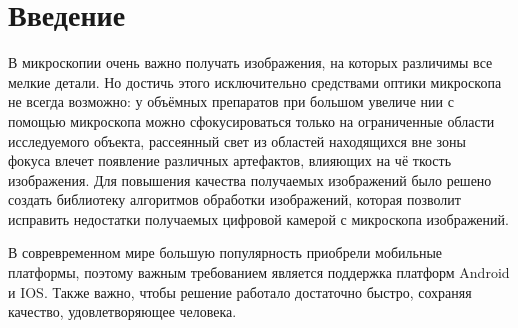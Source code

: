\documentclass[14pt]{matmex-diploma-custom}
\begin{document}

\maketitle
\tableofcontents
\section*{Введение}
В микроскопии очень важно получать изображения, на которых различимы все мелкие детали. Но достичь этого исключительно средствами оптики микроскопа не всегда возможно: у объёмных препаратов при большом увеличе    нии с помощью микроскопа можно сфокусироваться только на ограниченные области исследуемого объекта, рассеянный свет из областей находящихся вне зоны фокуса влечет появление различных артефактов, влияющих на чё    ткость изображения. Для повышения качества получаемых изображений было решено создать библиотеку алгоритмов обработки изображений, которая позволит исправить недостатки получаемых цифровой камерой с микроскопа изображений.
\par
В совревременном мире большую популярность приобрели мобильные платформы, поэтому важным требованием является поддержка платформ Android и IOS. Также важно, чтобы решение работало достаточно быстро, сохраняя качество, удовлетворяющее человека.
\end{document}
